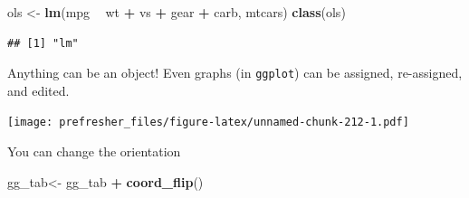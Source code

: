 \documentclass[]{book}
\newenvironment{Shaded}{\begin{snugshade}}{\end{snugshade}}
\newcommand{\DataTypeTok}[1]{\textcolor[rgb]{0.13,0.29,0.53}{#1}}
\newcommand{\KeywordTok}[1]{\textcolor[rgb]{0.13,0.29,0.53}{\textbf{#1}}}
\newcommand{\NormalTok}[1]{#1}
\newcommand{\OperatorTok}[1]{\textcolor[rgb]{0.81,0.36,0.00}{\textbf{#1}}}
\newcommand{\StringTok}[1]{\textcolor[rgb]{0.31,0.60,0.02}{#1}}
\theoremstyle{definition}
\theoremstyle{definition}
\theoremstyle{definition}
\theoremstyle{remark}
\begin{document}
\begin{Shaded}
\begin{Highlighting}[]
\begin{Shaded}
\begin{Highlighting}[]
\begin{Shaded}
\begin{Highlighting}[]
\begin{Shaded}
\begin{Highlighting}[]
\NormalTok{ols <-}\StringTok{ }\KeywordTok{lm}\NormalTok{(mpg }\OperatorTok{~}\StringTok{ }\NormalTok{wt }\OperatorTok{+}\StringTok{ }\NormalTok{vs }\OperatorTok{+}\StringTok{ }\NormalTok{gear }\OperatorTok{+}\StringTok{ }\NormalTok{carb, mtcars)}
\KeywordTok{class}\NormalTok{(ols)}
\end{Highlighting}
\end{Shaded}

\begin{verbatim}
## [1] "lm"
\end{verbatim}

Anything can be an object! Even graphs (in \texttt{ggplot}) can be assigned, re-assigned, and edited.

\begin{Shaded}
\end{Shaded}

\texttt{[image: prefresher\_files/figure-latex/unnamed-chunk-212-1.pdf]}

You can change the orientation

\begin{Shaded}
\begin{Highlighting}[]
\NormalTok{gg_tab<-}\StringTok{ }\NormalTok{gg_tab }\OperatorTok{+}\StringTok{ }\KeywordTok{coord_flip}\NormalTok{()}
\end{Highlighting}
\end{Shaded}


\end{Highlighting}
\end{Shaded}
\end{Highlighting}
\end{Shaded}
\end{Highlighting}
\end{Shaded}
\end{document}
